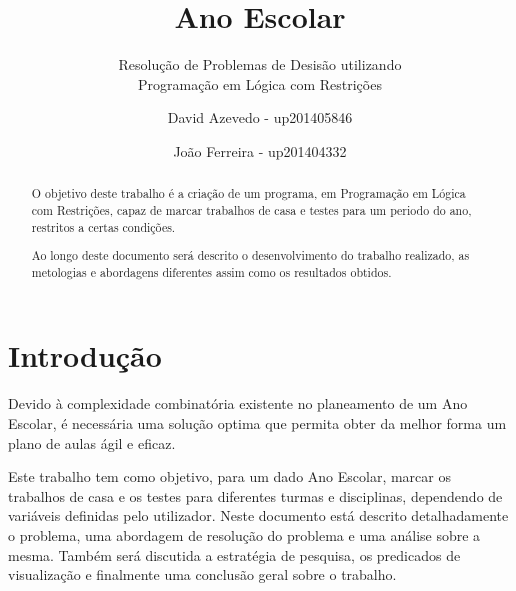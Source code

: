 \documentclass{llncs}
\begin{document}
%
\frontmatter          %
%
\pagestyle{headings}  %
%
\title{Ano Escolar}
\subtitle{Resolução de Problemas de Desisão utilizando\\
Programação em Lógica com Restrições}
%
%
\author{David Azevedo - up201405846 \and João Ferreira - up201404332}
%
%

\maketitle              %

\begin{abstract} %

O objetivo deste trabalho é a criação de um programa, em Programação em Lógica com Restrições, capaz de marcar trabalhos de casa e testes para um periodo do ano, restritos a certas condições.

Ao longo deste documento será descrito o desenvolvimento do trabalho realizado, as metologias e abordagens diferentes assim como os resultados obtidos.

\end{abstract}
%
\section{Introdução}
%
Devido à complexidade combinatória existente no planeamento de um Ano Escolar, é necessária uma solução optima que permita obter da melhor forma um plano de aulas ágil e eficaz.
 
Este trabalho tem como objetivo, para um dado Ano Escolar, marcar os trabalhos de casa e os testes para diferentes turmas e disciplinas, dependendo de variáveis definidas pelo utilizador.
Neste documento está descrito detalhadamente o problema, uma abordagem de resolução do problema e uma análise sobre a mesma. Também será discutida a estratégia de pesquisa, os predicados de visualização e finalmente uma conclusão geral sobre o trabalho.
\end{document}
